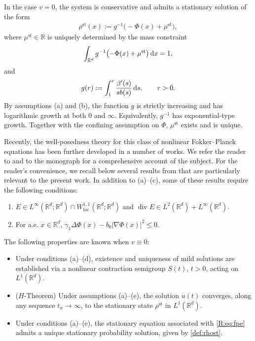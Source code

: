 \documentclass[UTF-8,reqno]{amsart}
\numberwithin{equation}{section}
\theoremstyle{definition}
\def\dif{{\mathord{{\rm d}}}}
\def\leq{\leqslant}
\def\dif{{\mathord{{\rm d}}}}
\def\leq{\leqslant}
\begin{document}
In the case $v=0$, the system is conservative and admits a stationary solution of the form
\begin{align}
\rho^{\mathrm{st}}(x)
:=
g^{-1}\bigl(-\Phi(x)+\mu^{\mathrm{st}}\bigr),
\label{def:rhost}
\end{align}
where $\mu^{\mathrm{st}}\in\mathbb{R}$ is uniquely determined by the mass
constraint
\begin{align}
\int_{\mathbb{R}^d}
g^{-1}\bigl(-\Phi(x)+\mu^{\mathrm{st}}\bigr)
\,\dif x
=
1 ,\notag
\end{align}
and
\begin{align}
g(r)
:=
\int_1^r
\frac{\beta'(s)}{s b(s)}
\,\dif s,
\qquad
r>0 .\notag
\end{align}
By assumptions \textnormal{(a)} and \textnormal{(b)}, the function $g$ is
strictly increasing and has logarithmic growth at both $0$ and $\infty$.
Equivalently, $g^{-1}$ has exponential-type growth. Together with the
confining assumption on $\Phi$,  $\mu^{\mathrm{st}}$ exists and is unique.  

Recently, the well-posedness theory for this class of nonlinear
Fokker--Planck equations has been further developed in a number of works. We
refer the reader to \cite{BR21,BR22,BR23,BR23b,Gru25} and to the monograph
\cite{BKRS22} for a comprehensive account of the subject. For the reader's
convenience, we recall below several results from \cite{BR23} that are
particularly relevant to the present work. In addition to
\textnormal{(a)}--\textnormal{(c)}, some of these results require the following
conditions:
\begin{enumerate}
    \item[(d)] $E\in L^\infty(\mathbb{R}^d;\mathbb{R}^d)
    \cap W^{1,1}_{\mathrm{loc}}(\mathbb{R}^d;\mathbb{R}^d)$ and
    $ 
    \operatorname{div}E
    \in    L^2(\mathbb{R}^d)+L^\infty(\mathbb{R}^d).
   $ 

    \item[(e)] For a.e. $x\in\mathbb{R}^d$, $
    \gamma_1\Delta\Phi(x)-b_0|\nabla\Phi(x)|^2
    \leq 0 .$ 
\end{enumerate}
The following properties are known when $v\equiv0$:
\begin{itemize}
    \item Under conditions \textnormal{(a)}--\textnormal{(d)}, existence and
    uniqueness of mild solutions are established via a nonlinear contraction
    semigroup $S(t)$, $t>0$, acting on $L^1(\mathbb{R}^d)$.

    \item \textnormal{($H$-Theorem)} Under assumptions
    \textnormal{(a)}--\textnormal{(e)},  the solution $u(t)$ converges, along
    any sequence $t_n\to\infty$, to the stationary state $\rho^{\mathrm{st}}$ in
    $L^1(\mathbb{R}^d)$.

    \item Under conditions \textnormal{(a)}--\textnormal{(e)}, the stationary
    equation associated with \eqref{R:eq:fpe} admits a unique stationary
    probability solution, given by \eqref{def:rhost}.
\end{itemize}
\end{document}
